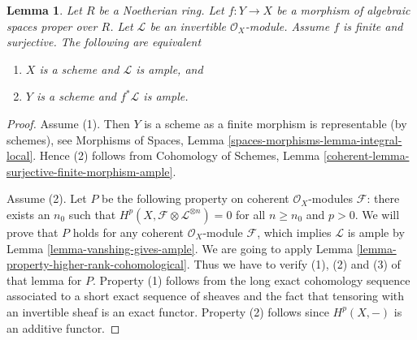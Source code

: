 \documentclass[10pt,a4paper]{amsart}
\theoremstyle{plain}
\newtheorem{lemma}[subsection]{Lemma}
\theoremstyle{definition}
\theoremstyle{remark}
\numberwithin{equation}{subsection}
\begin{document}
\begin{lemma}
\label{lemma-surjective-finite-morphism-ample}
Let $R$ be a Noetherian ring. Let $f : Y \to X$ be a morphism of
algebraic spaces proper over $R$. Let $\mathcal{L}$ be an
invertible $\mathcal{O}_X$-module. Assume $f$ is finite and surjective.
The following are equivalent
\begin{enumerate}
\item $X$ is a scheme and $\mathcal{L}$ is ample, and
\item $Y$ is a scheme and $f^*\mathcal{L}$ is ample.
\end{enumerate}
\end{lemma}

\begin{proof}
Assume (1). Then $Y$ is a scheme as a finite morphism is representable
(by schemes), see Morphisms of Spaces, Lemma
\ref{spaces-morphisms-lemma-integral-local}. Hence (2)
follows from Cohomology of Schemes, Lemma
\ref{coherent-lemma-surjective-finite-morphism-ample}.

\medskip\noindent
Assume (2). Let $P$ be the following property on
coherent $\mathcal{O}_X$-modules $\mathcal{F}$: there exists an $n_0$
such that $H^p(X, \mathcal{F} \otimes \mathcal{L}^{\otimes n}) = 0$
for all $n \geq n_0$ and $p > 0$. We will prove that $P$ holds
for any coherent $\mathcal{O}_X$-module $\mathcal{F}$, which implies
$\mathcal{L}$ is ample by Lemma \ref{lemma-vanshing-gives-ample}.
We are going to apply Lemma \ref{lemma-property-higher-rank-cohomological}.
Thus we have to verify (1), (2) and (3) of that lemma for $P$.
Property (1) follows from the long exact cohomology sequence associated
to a short exact sequence of sheaves and the fact that tensoring with
an invertible sheaf is an exact functor. Property (2) follows since
$H^p(X, -)$ is an additive functor.


\end{proof}
\end{document}
